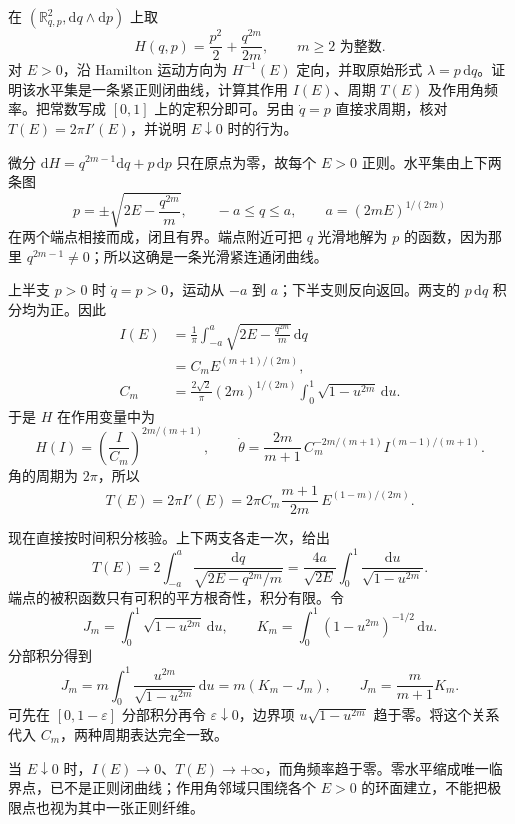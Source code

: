 \begin{exercise}\label{g4:ex:1102:power-well-action}
	在 \((\mathbb R^2_{q,p},\mathrm{d}q\wedge\mathrm{d}p)\) 上取
	\[
		H(q,p)=\frac{p^2}{2}+\frac{q^{2m}}{2m},
		\qquad m\ge2\text{ 为整数}.
	\]
	对 \(E>0\)，沿 Hamilton 运动方向为 \(H^{-1}(E)\) 定向，并取原始形式 \(\lambda=p\,\mathrm{d}q\)。证明该水平集是一条紧正则闭曲线，计算其作用 \(I(E)\)、周期 \(T(E)\) 及作用角频率。把常数写成 \([0,1]\) 上的定积分即可。另由 \(\dot q=p\) 直接求周期，核对 \(T(E)=2\pi I'(E)\)，并说明 \(E\downarrow0\) 时的行为。
\end{exercise}
\begin{solution}
	微分
	\(\mathrm{d}H=q^{2m-1}\mathrm{d}q+p\,\mathrm{d}p\)
	只在原点为零，故每个 \(E>0\) 正则。水平集由上下两条图
	\[
		p=\pm\sqrt{2E-\frac{q^{2m}}m},
		\qquad -a\le q\le a,\qquad a=(2mE)^{1/(2m)}
	\]
	在两个端点相接而成，闭且有界。端点附近可把 \(q\) 光滑地解为 \(p\) 的函数，因为那里 \(q^{2m-1}\ne0\)；所以这确是一条光滑紧连通闭曲线。

	上半支 \(p>0\) 时 \(\dot q=p>0\)，运动从 \(-a\) 到 \(a\)；下半支则反向返回。两支的 \(p\,\mathrm{d}q\) 积分均为正。因此
	\[
		\begin{aligned}
			I(E)
			&=\frac1\pi\int_{-a}^a
			\sqrt{2E-\frac{q^{2m}}m}\,\mathrm{d}q\\
			&=C_m E^{(m+1)/(2m)},\\
			C_m&=\frac{2\sqrt2}{\pi}(2m)^{1/(2m)}
			\int_0^1\sqrt{1-u^{2m}}\,\mathrm{d}u.
		\end{aligned}
	\]
	于是 \(H\) 在作用变量中为
	\[
		H(I)=\left(\frac I{C_m}\right)^{2m/(m+1)},\qquad
		\dot\theta=\frac{2m}{m+1}\,
			C_m^{-2m/(m+1)}I^{(m-1)/(m+1)}.
	\]
	角的周期为 \(2\pi\)，所以
	\[
		T(E)=2\pi I'(E)
		=2\pi C_m\frac{m+1}{2m}\,
			E^{(1-m)/(2m)}.
	\]

	现在直接按时间积分核验。上下两支各走一次，给出
	\[
		T(E)=2\int_{-a}^a
		\frac{\mathrm{d}q}{\sqrt{2E-q^{2m}/m}}
		=\frac{4a}{\sqrt{2E}}
		\int_0^1\frac{\mathrm{d}u}{\sqrt{1-u^{2m}}}.
	\]
	端点的被积函数只有可积的平方根奇性，积分有限。令
	\[
		J_m=\int_0^1\sqrt{1-u^{2m}}\,\mathrm{d}u,\qquad
		K_m=\int_0^1(1-u^{2m})^{-1/2}\,\mathrm{d}u.
	\]
	分部积分得到
	\[
		J_m
		=m\int_0^1\frac{u^{2m}}{\sqrt{1-u^{2m}}}\,\mathrm{d}u
		=m(K_m-J_m),
		\qquad J_m=\frac m{m+1}K_m.
	\]
	可先在 \([0,1-\varepsilon]\) 分部积分再令 \(\varepsilon\downarrow0\)，边界项 \(u\sqrt{1-u^{2m}}\) 趋于零。将这个关系代入 \(C_m\)，两种周期表达完全一致。

	当 \(E\downarrow0\) 时，\(I(E)\to0\)、\(T(E)\to+\infty\)，而角频率趋于零。零水平缩成唯一临界点，已不是正则闭曲线；作用角邻域只围绕各个 \(E>0\) 的环面建立，不能把极限点也视为其中一张正则纤维。
\end{solution}

